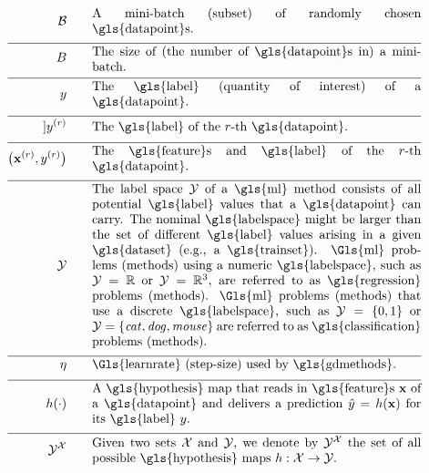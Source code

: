 \begin{align}
	\batch \quad\quad &\parbox{.75\textwidth}{A mini-batch (subset) of randomly chosen \gls{datapoint}s.}\nonumber \\[2mm] \hline \nonumber\\[-5mm]
	\batchsize \quad\quad &\parbox{.75\textwidth}{The size of (the number of \gls{datapoint}s in) a mini-batch.}\nonumber \\[2mm] \hline \nonumber\\[-5mm]
	\truelabel \quad\quad &\parbox{.75\textwidth}{The \gls{label} (quantity of interest) of a \gls{datapoint}.} \nonumber \\[2mm] \hline \nonumber\\[-5mm]] 
	\truelabel^{(\sampleidx)} \quad\quad &\parbox{.75\textwidth}{The \gls{label} of the $\sampleidx$-th \gls{datapoint}.} \nonumber \\[2mm] \hline \nonumber\\[-5mm]
	\big(\featurevec^{(\sampleidx)},\truelabel^{(\sampleidx)}\big)  \quad\quad &\parbox{.75\textwidth}{The \gls{feature}s and \gls{label} of the $\sampleidx$-th \gls{datapoint}.}\nonumber \\[2mm] \hline \nonumber\\[-5mm]
	\labelspace  \quad\quad & \parbox{.75\textwidth}{The label space $\labelspace$ of 
		a \gls{ml} method consists of all potential \gls{label} values that a \gls{datapoint} can 
		carry. The nominal \gls{labelspace} might be larger than the set of different \gls{label} 
		values arising in a given \gls{dataset} (e.g., a \gls{trainset}). \Gls{ml} problems 
		(methods) using a numeric \gls{labelspace}, such as $\labelspace=\mathbb{R}$ 
		or $\labelspace=\mathbb{R}^{3}$, are referred to as \gls{regression} problems (methods). \Gls{ml} 
		problems (methods) that use a discrete \gls{labelspace}, such as $\labelspace=\{0,1\}$ or $\labelspace=\{\mbox{\emph{cat}},\mbox{\emph{dog}},\mbox{\emph{mouse}}\}$ 
		are referred to as \gls{classification} problems (methods).}  \nonumber \\[2mm] \hline \nonumber\\[-5mm]
	\lrate  \quad\quad & \parbox{.75\textwidth}{\Gls{learnrate} (step-size) used by \gls{gdmethods}.}  \nonumber \\[2mm] \hline \nonumber\\[-5mm]
	\hypothesis(\cdot)  \quad\quad &\parbox{.75\textwidth}{A \gls{hypothesis} map that reads in \gls{feature}s $\featurevec$ of a \gls{datapoint} 
		and delivers a prediction $\hat{\truelabel}=\hypothesis(\featurevec)$ for its \gls{label} $\truelabel$.}  	 \nonumber \\[2mm] \hline \nonumber\\[-5mm]
	 \labelspace^{\featurespace} \quad\quad & \parbox{.75\textwidth}{Given two sets $\featurespace$ and $\labelspace$, we denote by $ \labelspace^{\featurespace}$ the set of all possible \gls{hypothesis} maps $\hypothesis: \featurespace \rightarrow \labelspace$.} 	 \nonumber 
\end{align}                  


